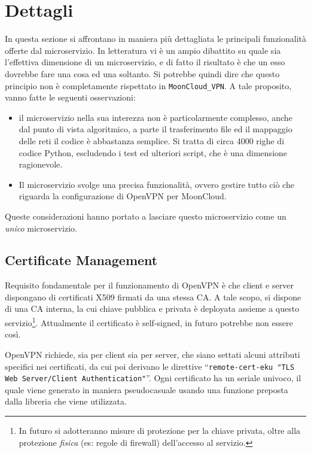 \section{Dettagli}
In questa sezione si affrontano in maniera più dettagliata le principali funzionalità
offerte dal microservizio. In letteratura \cite{7030212} \cite{8229914} vi è un ampio
dibattito su quale sia
l'effettiva dimensione di un microservizio, e di fatto il risultato è che un esso
dovrebbe fare una cosa ed una soltanto. Si potrebbe quindi dire che questo principio
non è completamente rispettato in \texttt{MoonCloud\_VPN}. A tale proposito, vanno fatte
le seguenti osservazioni:
\begin{itemize}
	\item il microservizio nella sua interezza non è particolarmente complesso, anche
	      dal punto di vista algoritmico, a parte il trasferimento file ed il mappaggio
	      delle reti il codice è abbastanza semplice. 
	      Si tratta di circa 4000 righe di codice Python, escludendo i test ed ulteriori script,
	      che è una dimensione ragionevole.
	\item Il microservizio svolge una precisa funzionalità, ovvero gestire tutto ciò
	      che riguarda la configurazione di OpenVPN  per MoonCloud.
\end{itemize}
Queste considerazioni hanno portato a lasciare questo microservizio come un \textit{unico}
microservizio.

\subsection{Certificate Management}
Requisito fondamentale per il funzionamento di OpenVPN è che client e server dispongano
di certificati X509 firmati da una stessa CA.
A tale scopo, si dispone di una CA interna, la cui chiave pubblica e privata è deployata
assieme a questo servizio\footnote{In futuro si adotteranno misure di protezione per la
	chiave privata, oltre alla protezione \textit{fisica} (es: regole di firewall) dell'accesso
al servizio.}. Attualmente il certificato è self-signed, in futuro potrebbe non essere così.

OpenVPN richiede, sia per client sia per server, che siano settati alcuni attributi
specifici nei certificati, da cui poi derivano le direttive
``\texttt{remote-cert-eku "TLS Web Server/Client
Authentication"}''. Ogni certificato ha un seriale univoco, il quale viene generato
in maniera pseudocasuale usando una funzione preposta dalla libreria che viene
utilizzata.


